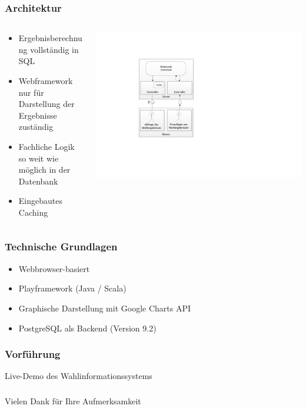 \documentclass{beamer}
\begin{document}
\begin{frame}
\frametitle{Architektur}
\begin{columns}
\begin{column}{7cm}
\begin{itemize}
\item Ergebnisberechnung vollständig in SQL
\item Webframework nur für Darstellung der Ergebnisse zuständig
\item Fachliche Logik so weit wie möglich in der Datenbank
\item Eingebautes Caching
\end{itemize}
\end{column}
\begin{column}{6cm}
\includegraphics[scale=0.7]{Architecture.pdf}
\end{column}
\end{columns}
\end{frame}

\begin{frame}
\frametitle{Technische Grundlagen}
\begin{itemize}
\item Webbrowser-basiert
\item Playframework (Java / Scala)
\item Graphische Darstellung mit Google Charts API
\item PostgreSQL als Backend (Version 9.2)
\end{itemize}
\end{frame}


\begin{frame}
\frametitle{Vorführung}
\begin{center}
Live-Demo des Wahlinformationssystems
\end{center}
\end{frame}

\begin{frame}
\frametitle{}
\begin{center}
Vielen Dank für Ihre Aufmerksamkeit
\end{center}
\end{frame}


\end{document}
